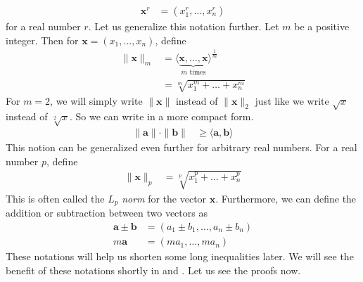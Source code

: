 \documentclass{subfile}
\begin{document}
		\begin{align*}
			\mathbf{x}^{r}
				& = \left(x_{1}^{r},\ldots,x_{n}^{r}\right)
		\end{align*}
	for a real number $r$. Let us generalize this notation further. Let $m$ be a positive integer. Then for $\mathbf{x}=(x_1,\ldots,x_n)$, define
		\begin{align*}
			\| \mathbf{x}\|_{m}
				& = \langle\underbrace{\mathbf{x},\ldots,\mathbf{x}}_{m\mbox{ times}}\rangle^{\frac{1}{m}}\\
				& = \sqrt[m]{x_1^m+\ldots+x_n^m}
		\end{align*}
	For $m=2$, we will simply write $\| \mathbf{x}\| $ instead of $\| \mathbf{x}\| _2$ just like we write $\sqrt{x}$ instead of $\sqrt[2]{x}$. So we can write  in a more compact form.
		\begin{align*}
			\| \mathbf{a}\| \cdot\| \mathbf{b}\|
				& \geq\langle\mathbf{a},\mathbf{b}\rangle
		\end{align*}
	This notion can be generalized even further for arbitrary real numbers. For a real number $p$, define
		\begin{align*}
			\| \mathbf{x}\|_{p}
				& = \sqrt[p]{x_{1}^{p}+\ldots+x_{n}^{p}}
		\end{align*}
	This is often called the $L_{p}$ \textit{norm} for the vector $\mathbf{x}$. Furthermore, we can define the addition or subtraction between two vectors as
		\begin{align*}
			\mathbf{a}\pm \mathbf{b}
				& = (a_{1}\pm b_{1},\ldots,a_{n}\pm b_{n})\\
			m\mathbf{a}
				& = (ma_{1},\ldots,ma_{n})
		\end{align*}
	These notations will help us shorten some long inequalities later. We will see the benefit of these notations shortly in  and . Let us see the proofs now.
\end{document}
